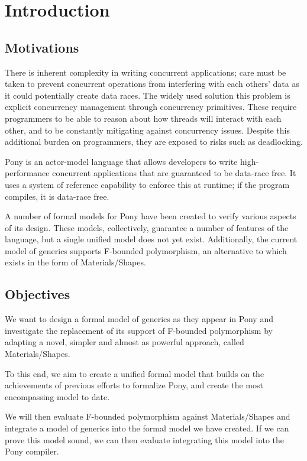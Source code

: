 \chapter{Introduction}

\section{Motivations}

There is inherent complexity in writing concurrent applications; care must be taken to prevent concurrent operations from interfering with each others' data as it could potentially create data races. The widely used solution this problem is explicit concurrency management through concurrency primitives. These require programmers to be able to reason about how threads will interact with each other, and to be constantly mitigating against concurrency issues. Despite this additional burden on programmers, they are exposed to risks such as deadlocking.

Pony is an actor-model language that allows developers to write high-performance concurrent applications that are guaranteed to be data-race free. It uses a system of reference capability to enforce this at runtime; if the program compiles, it is data-race free.

A number of formal models for Pony have been created to verify various aspects of its design. These models, collectively, guarantee a number of features of the language, but a single unified model does not yet exist. Additionally, the current model of generics supports F-bounded polymorphism, an alternative to which exists in the form of Materials/Shapes.

\section{Objectives}

We want to design a formal model of generics as they appear in Pony and investigate the replacement of its support of F-bounded polymorphism by adapting a novel, simpler and almost as powerful approach, called Materials/Shapes.

To this end, we aim to create a unified formal model that builds on the achievements of previous efforts to formalize Pony, and create the most encompassing model to date.

We will then evaluate F-bounded polymorphism against Materials/Shapes and integrate a model of generics into the formal model we have created. If we can prove this model sound, we can then evaluate integrating this model into the Pony compiler.

